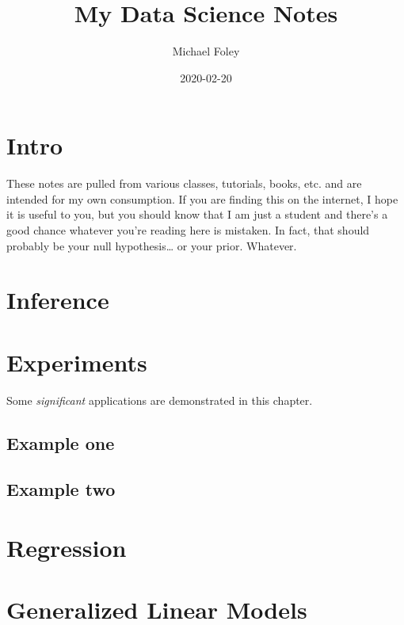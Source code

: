 \documentclass[
]{book}
\title{My Data Science Notes}
\author{Michael Foley}
\date{2020-02-20}
\begin{document}
\maketitle

{
\setcounter{tocdepth}{1}
\tableofcontents
}
\hypertarget{intro}{%
\chapter*{Intro}\label{intro}}

These notes are pulled from various classes, tutorials, books, etc. and are intended for my own consumption. If you are finding this on the internet, I hope it is useful to you, but you should know that I am just a student and there's a good chance whatever you're reading here is mistaken. In fact, that should probably be your null hypothesis\ldots{} or your prior. Whatever.

\hypertarget{inference}{%
\chapter{Inference}\label{inference}}

\hypertarget{experiments}{%
\chapter{Experiments}\label{experiments}}

Some \emph{significant} applications are demonstrated in this chapter.

\hypertarget{example-one}{%
\section{Example one}\label{example-one}}

\hypertarget{example-two}{%
\section{Example two}\label{example-two}}

\hypertarget{regression}{%
\chapter{Regression}\label{regression}}

\hypertarget{generalized-linear-models}{%
\chapter{Generalized Linear Models}\label{generalized-linear-models}}
\end{document}

